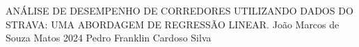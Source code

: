 \documentclass[12pt,openright]{paper}
\begin{document}
%
%
%
\capa
{ANÁLISE DE DESEMPENHO DE CORREDORES UTILIZANDO DADOS DO STRAVA: UMA ABORDAGEM DE REGRESSÃO LINEAR.}
{João Marcos de Souza Matos}
{2024}
{Pedro Franklin Cardoso Silva}
% 
%
\end{document}

